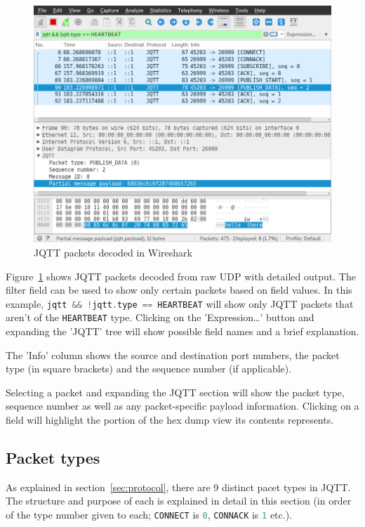 \documentclass[a4paper]{article}
\numberwithin{figure}{section}
\numberwithin{table}{section}
\newcommand{\mi}{\mintinline}
\begin{document}
\begin{figure}[h!]
	\centering
	\includegraphics[width=\textwidth]{dissector}
	\caption{JQTT packets decoded in Wireshark}
	\label{fig:dissector}
\end{figure}

Figure~\ref{fig:dissector} shows JQTT packets decoded from raw UDP with detailed output. The filter field can be used to show only certain packets based on field values. In this example, \mi{c}{jqtt && !jqtt.type == HEARTBEAT} will show only JQTT packets that aren't of the \mi{c}{HEARTBEAT} type. Clicking on the 'Expression\dots' button and expanding the 'JQTT' tree will show possible field names and a brief explanation.

The 'Info' column shows the source and destination port numbers, the packet type (in square brackets) and the sequence number (if applicable).

Selecting a packet and expanding the JQTT section will show the packet type, sequence number as well as any packet-specific payload information. Clicking on a field will highlight the portion of the hex dump view its contents represents.

\newpage
\subsection{Packet types}
As explained in section~\ref{sec:protocol}, there are 9 distinct pacet types in JQTT. The structure and purpose of each is explained in detail in this section (in order of the type number given to each; \mi{c}{CONNECT} is \mi{c}{0}, \mi{c}{CONNACK} is \mi{c}{1} etc.).
\end{document}
